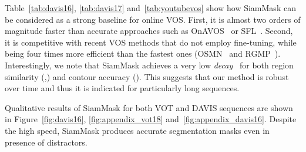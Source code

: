 \documentclass[10pt,twocolumn,letterpaper]{article}
\begin{document}
Table~\ref{tab:davis16}, \ref{tab:davis17} and~\ref{tab:youtubevos} show how SiamMask can be considered as a strong baseline for online VOS.
First, it is almost two orders of magnitude faster than accurate approaches such as OnAVOS~\cite{voigtlaender2017online} or SFL~\cite{cheng2017segflow}.
Second, it is competitive with recent VOS methods that do not employ fine-tuning, while being four times more efficient than the fastest ones (\ie OSMN~\cite{Yang_2018_CVPR} and RGMP~\cite{wug2018fast}).
Interestingly, we note that SiamMask achieves a very low \emph{decay}~\cite{perazzi2016benchmark} for both region similarity (,) and contour accuracy ().
This suggests that our method is robust over time and thus it is indicated for particularly long sequences.

Qualitative results of SiamMask for both VOT and DAVIS sequences are shown in Figure~\ref{fig:davis16}, \ref{fig:appendix_vot18} and~\ref{fig:appendix_davis16}.
Despite the high speed, SiamMask produces accurate segmentation masks even in presence of distractors.
\end{document}
